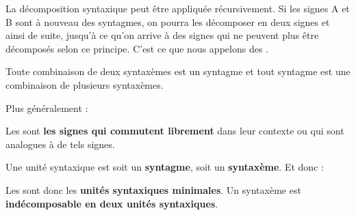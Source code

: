 La décomposition syntaxique peut être appliquée récursivement. Si les signes A et B sont à nouveau des syntagmes, on pourra les décomposer en deux signes et ainsi de suite, jusqu’à ce qu’on arrive à des signes qui ne peuvent plus être décomposés selon ce principe. C’est ce que nous appelons des .

Toute combinaison de deux syntaxèmes est un syntagme et tout syntagme est une combinaison de plusieurs syntaxèmes.

Plus généralement :

{Les  sont \textbf{les signes qui commutent librement} dans leur contexte ou qui sont analogues à de tels signes.}

Une unité syntaxique est soit un \textbf{syntagme}, soit un \textbf{syntaxème}. Et donc :

{Les  sont donc les \textbf{unités syntaxiques minimales}. Un syntaxème est \textbf{indécomposable en deux unités syntaxiques}.}

